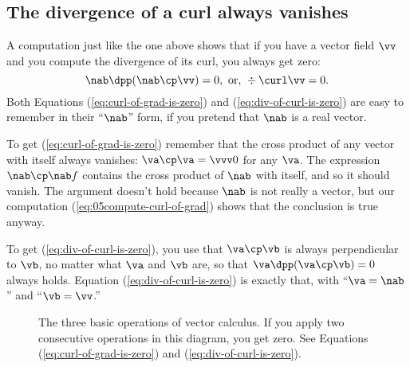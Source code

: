 \subsection{The divergence of a curl always vanishes}  
\label{sec:div-of-curve-is-zero}
A computation just like the one above shows that if you have a vector field
$\vv$ and you compute the divergence of its curl, you always get zero:
\begin{equation}
  \label{eq:div-of-curl-is-zero}
  \nab\dpp(\nab\cp\vv) = 0, \text{ or, }
  \div \curl \vv = 0.
\end{equation}
Both Equations (\ref{eq:curl-of-grad-is-zero}) and
(\ref{eq:div-of-curl-is-zero}) are easy to remember in their ``$\nab$''
form, if you pretend that $\nab$ is a real vector.

To get (\ref{eq:curl-of-grad-is-zero}) remember that the cross product of
any vector with itself always vanishes: $\va \cp \va =\vvv0$ for any $\va$.
The expression $\nab\cp\nab f$ contains the cross product of $\nab$ with
itself, and so it should vanish.   The argument doesn't hold because $\nab$
is not really a vector, but our computation
(\ref{eq:05compute-curl-of-grad}) shows that the conclusion is true anyway.

To get (\ref{eq:div-of-curl-is-zero}), you use that $\va\cp\vb$ is always
perpendicular to $\vb$, no matter what $\va$ and $\vb$ are, so that
$\va\dpp(\va\cp\vb) = 0$ always holds.   Equation
(\ref{eq:div-of-curl-is-zero}) is exactly that, with ``$\va = \nab$'' and
``$\vb = \vv$.''

\begin{figure}[t]
  \centering{}
  \caption{The three basic operations of vector calculus.   If you apply two
    consecutive operations in this diagram, you get zero.   See Equations
    (\ref{eq:curl-of-grad-is-zero}) and (\ref{eq:div-of-curl-is-zero}).}
\end{figure}
